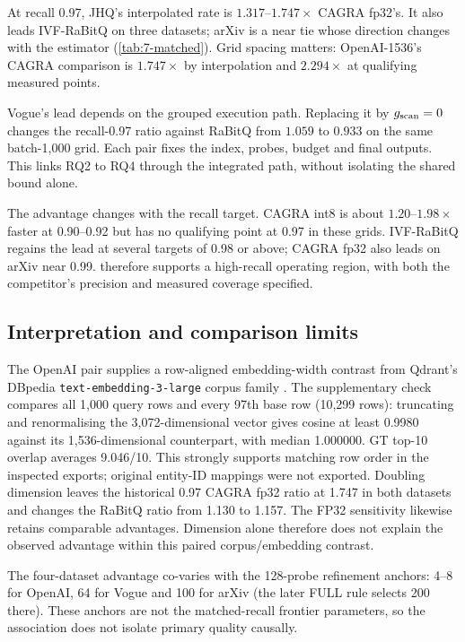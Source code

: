 At recall 0.97, JHQ's interpolated rate is $1.317$--$1.747\times$
CAGRA fp32's. It also leads IVF-RaBitQ on three datasets; arXiv is a
near tie whose direction changes with the estimator (\cref{tab:7-matched}).
Grid spacing matters: OpenAI-1536's CAGRA comparison is $1.747\times$
by interpolation and $2.294\times$ at qualifying measured points.

Vogue's lead depends on the grouped execution path. Replacing it by
$g_{\mathrm{scan}}=0$ changes the recall-0.97 ratio against RaBitQ from $1.059$
to $0.933$ on the same batch-1,000 grid. Each pair fixes the index,
probes, budget and final outputs. This links RQ2 to RQ4 through the
integrated path, without isolating the shared bound alone.

The advantage changes with the recall target. CAGRA int8 is about
$1.20$--$1.98\times$ faster at 0.90--0.92 but has no qualifying point
at 0.97 in these grids. IVF-RaBitQ regains the lead at several targets
of 0.98 or above; CAGRA fp32 also leads on arXiv near 0.99.
 therefore supports a high-recall operating region,
with both the competitor's precision and measured coverage specified.



\subsection{Interpretation and comparison limits}

The OpenAI pair supplies a row-aligned embedding-width contrast from
Qdrant's DBpedia \texttt{text-embedding-3-large} corpus family
\cite{data_openai1536,data_openai3072}. The supplementary check compares
all 1,000 query rows and every 97th base row (10,299 rows): truncating
and renormalising the 3,072-dimensional vector gives cosine at least
0.9980 against its 1,536-dimensional counterpart, with median 1.000000.
GT top-10 overlap averages 9.046/10. This strongly supports matching row
order in the inspected exports; original entity-ID mappings were not
exported. Doubling dimension leaves the historical 0.97 CAGRA fp32
ratio at 1.747 in both datasets and changes the RaBitQ ratio from
1.130 to 1.157. The FP32 sensitivity likewise retains comparable
advantages. Dimension alone therefore does not explain the observed
advantage within this paired corpus/embedding contrast.

The four-dataset advantage co-varies with the 128-probe refinement
anchors: 4--8 for OpenAI, 64 for Vogue and 100 for arXiv
(the later FULL rule selects 200 there). These anchors are not the
matched-recall frontier parameters, so the association does not isolate
primary quality causally.

